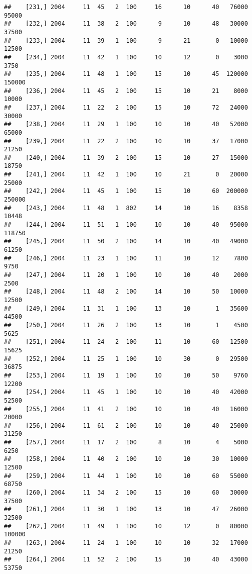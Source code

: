 \documentclass{article}\usepackage[]{graphicx}\usepackage[]{color}
\makeatletter
\newenvironment{kframe}{%
 \def\at@end@of@kframe{}%
 \ifinner\ifhmode%
  \def\at@end@of@kframe{\end{minipage}}%
  \begin{minipage}{\columnwidth}%
 \fi\fi%
 \def\FrameCommand##1{\hskip\@totalleftmargin \hskip-\fboxsep
 \colorbox{shadecolor}{##1}\hskip-\fboxsep
     \hskip-\linewidth \hskip-\@totalleftmargin \hskip\columnwidth}%
 \MakeFramed {\advance\hsize-\width
   \@totalleftmargin\z@ \linewidth\hsize
   \@setminipage}}%
 {\par\unskip\endMakeFramed%
 \at@end@of@kframe}
\newenvironment{knitrout}{}{} %
\makeatother
\begin{document}
\begin{knitrout}
\begin{kframe}
\begin{verbatim}
##    [231,] 2004     11  45   2  100     16      10      40   76000   95000
##    [232,] 2004     11  38   2  100      9      10      48   30000   37500
##    [233,] 2004     11  39   1  100      9      21       0   10000   12500
##    [234,] 2004     11  42   1  100     10      12       0    3000    3750
##    [235,] 2004     11  48   1  100     15      10      45  120000  150000
##    [236,] 2004     11  45   2  100     15      10      21    8000   10000
##    [237,] 2004     11  22   2  100     15      10      72   24000   30000
##    [238,] 2004     11  29   1  100     10      10      40   52000   65000
##    [239,] 2004     11  22   2  100     10      10      37   17000   21250
##    [240,] 2004     11  39   2  100     15      10      27   15000   18750
##    [241,] 2004     11  42   1  100     10      21       0   20000   25000
##    [242,] 2004     11  45   1  100     15      10      60  200000  250000
##    [243,] 2004     11  48   1  802     14      10      16    8358   10448
##    [244,] 2004     11  51   1  100     10      10      40   95000  118750
##    [245,] 2004     11  50   2  100     14      10      40   49000   61250
##    [246,] 2004     11  23   1  100     11      10      12    7800    9750
##    [247,] 2004     11  20   1  100     10      10      40    2000    2500
##    [248,] 2004     11  48   2  100     14      10      50   10000   12500
##    [249,] 2004     11  31   1  100     13      10       1   35600   44500
##    [250,] 2004     11  26   2  100     13      10       1    4500    5625
##    [251,] 2004     11  24   2  100     11      10      60   12500   15625
##    [252,] 2004     11  25   1  100     10      30       0   29500   36875
##    [253,] 2004     11  19   1  100     10      10      50    9760   12200
##    [254,] 2004     11  45   1  100     10      10      40   42000   52500
##    [255,] 2004     11  41   2  100     10      10      40   16000   20000
##    [256,] 2004     11  61   2  100     10      10      40   25000   31250
##    [257,] 2004     11  17   2  100      8      10       4    5000    6250
##    [258,] 2004     11  40   2  100     10      10      30   10000   12500
##    [259,] 2004     11  44   1  100     10      10      60   55000   68750
##    [260,] 2004     11  34   2  100     15      10      60   30000   37500
##    [261,] 2004     11  30   1  100     13      10      47   26000   32500
##    [262,] 2004     11  49   1  100     10      12       0   80000  100000
##    [263,] 2004     11  24   1  100     10      10      32   17000   21250
##    [264,] 2004     11  52   2  100     15      10      40   43000   53750

\end{verbatim}
\end{kframe}
\end{knitrout}
\end{document}
